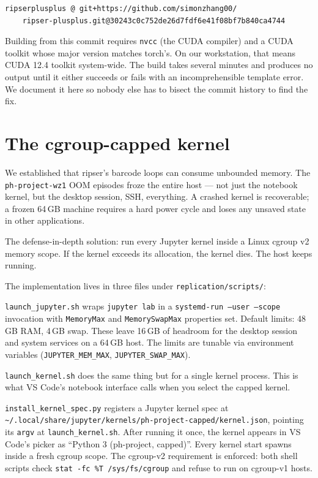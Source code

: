 \begin{verbatim}
ripserplusplus @ git+https://github.com/simonzhang00/
    ripser-plusplus.git@30243c0c752de26d7fdf6e41f08bf7b840ca4744
\end{verbatim}

Building from this commit requires \texttt{nvcc} (the CUDA compiler) and a CUDA toolkit whose major version matches torch's. On our workstation, that means CUDA 12.4 toolkit system-wide. The build takes several minutes and produces no output until it either succeeds or fails with an incomprehensible template error. We document it here so nobody else has to bisect the commit history to find the fix.

\section{The cgroup-capped kernel}
\label{sec:cgroup-kernel}

We established that ripser's barcode loops can consume unbounded memory. The \texttt{ph-project-wz1} OOM episodes froze the entire host --- not just the notebook kernel, but the desktop session, SSH, everything. A crashed kernel is recoverable; a frozen 64\,GB machine requires a hard power cycle and loses any unsaved state in other applications.

The defense-in-depth solution: run every Jupyter kernel inside a Linux cgroup v2 memory scope. If the kernel exceeds its allocation, the kernel dies. The host keeps running.

The implementation lives in three files under \texttt{replication/scripts/}:

\texttt{launch\_jupyter.sh} wraps \texttt{jupyter lab} in a \texttt{systemd-run --user --scope} invocation with \texttt{MemoryMax} and \texttt{MemorySwapMax} properties set. Default limits: 48\,GB RAM, 4\,GB swap. These leave 16\,GB of headroom for the desktop session and system services on a 64\,GB host. The limits are tunable via environment variables (\texttt{JUPYTER\_MEM\_MAX}, \texttt{JUPYTER\_SWAP\_MAX}).

\texttt{launch\_kernel.sh} does the same thing but for a single kernel process. This is what VS Code's notebook interface calls when you select the capped kernel.

\texttt{install\_kernel\_spec.py} registers a Jupyter kernel spec at \texttt{\textasciitilde/.local/share/jupyter/kernels/ph-project-capped/kernel.json}, pointing its \texttt{argv} at \texttt{launch\_kernel.sh}. After running it once, the kernel appears in VS Code's picker as ``Python 3 (ph-project, capped)''. Every kernel start spawns inside a fresh cgroup scope. The cgroup-v2 requirement is enforced: both shell scripts check \texttt{stat -fc \%T /sys/fs/cgroup} and refuse to run on cgroup-v1 hosts.

